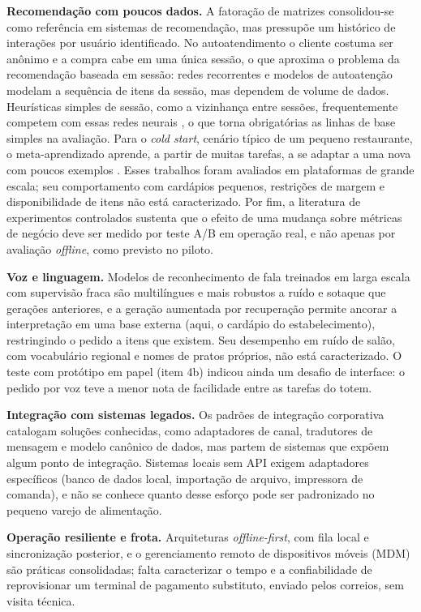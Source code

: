 \documentclass[12pt,a4paper]{article}
\begin{document}
\textbf{Recomendação com poucos dados.} A fatoração de matrizes \cite{koren2009} consolidou-se como referência em sistemas de recomendação, mas pressupõe um histórico de interações por usuário identificado. No autoatendimento o cliente costuma ser anônimo e a compra cabe em uma única sessão, o que aproxima o problema da recomendação baseada em sessão: redes recorrentes \cite{hidasi2016} e modelos de autoatenção \cite{kang2018} modelam a sequência de itens da sessão, mas dependem de volume de dados. Heurísticas simples de sessão, como a vizinhança entre sessões, frequentemente competem com essas redes neurais \cite{ludewig2018}, o que torna obrigatórias as linhas de base simples na avaliação. Para o \textit{cold start}, cenário típico de um pequeno restaurante, o meta-aprendizado aprende, a partir de muitas tarefas, a se adaptar a uma nova com poucos exemplos \cite{vartak2017, lee2019}. Esses trabalhos foram avaliados em plataformas de grande escala; seu comportamento com cardápios pequenos, restrições de margem e disponibilidade de itens não está caracterizado. Por fim, a literatura de experimentos controlados \cite{kohavi2020} sustenta que o efeito de uma mudança sobre métricas de negócio deve ser medido por teste A/B em operação real, e não apenas por avaliação \textit{offline}, como previsto no piloto.

\textbf{Voz e linguagem.} Modelos de reconhecimento de fala treinados em larga escala com supervisão fraca \cite{radford2023} são multilíngues e mais robustos a ruído e sotaque que gerações anteriores, e a geração aumentada por recuperação \cite{lewis2020} permite ancorar a interpretação em uma base externa (aqui, o cardápio do estabelecimento), restringindo o pedido a itens que existem. Seu desempenho em ruído de salão, com vocabulário regional e nomes de pratos próprios, não está caracterizado. O teste com protótipo em papel (item 4b) indicou ainda um desafio de interface: o pedido por voz teve a menor nota de facilidade entre as tarefas do totem.

\textbf{Integração com sistemas legados.} Os padrões de integração corporativa \cite{hohpe2003} catalogam soluções conhecidas, como adaptadores de canal, tradutores de mensagem e modelo canônico de dados, mas partem de sistemas que expõem algum ponto de integração. Sistemas locais sem API exigem adaptadores específicos (banco de dados local, importação de arquivo, impressora de comanda), e não se conhece quanto desse esforço pode ser padronizado no pequeno varejo de alimentação.

\textbf{Operação resiliente e frota.} Arquiteturas \textit{offline-first}, com fila local e sincronização posterior, e o gerenciamento remoto de dispositivos móveis (MDM) são práticas consolidadas; falta caracterizar o tempo e a confiabilidade de reprovisionar um terminal de pagamento substituto, enviado pelos correios, sem visita técnica.
\end{document}
